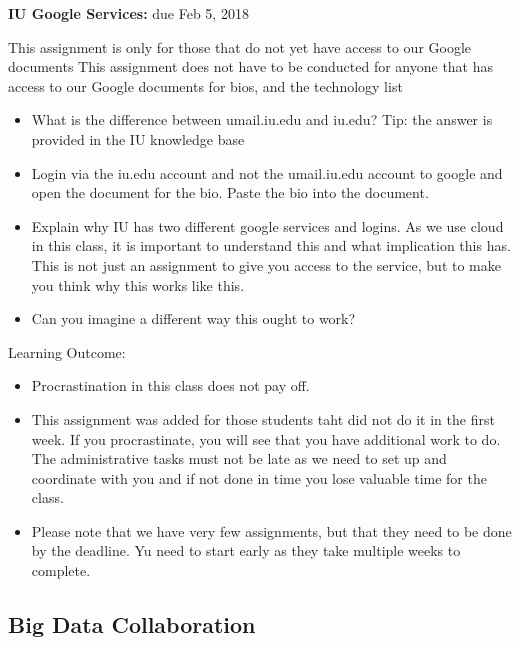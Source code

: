 \begin{exercise}\label{E:616-iu-google}

  {\bf IU Google Services:} due Feb 5, 2018
  
  This assignment is only for those that do
  not yet have access to our Google documents This assignment does not
  have to be conducted for anyone that has access to our Google
  documents for bios, and the technology list

  \begin{itemize}
 
  \item What is the difference between umail.iu.edu and iu.edu? Tip:
    the answer is provided in the IU knowledge base

  \item Login via the iu.edu account and not the umail.iu.edu account
    to google and open the document for the bio. Paste the bio into
    the document.

  \item Explain why IU has two different google services and
    logins. As we use cloud in this class, it is important to
    understand this and what implication this has. This is not just an
    assignment to give you access to the service, but to make you
    think why this works like this.

  \item Can you imagine a different way this ought to work?

  \end{itemize}

\end{exercise}

Learning Outcome:

\begin{itemize}
\item Procrastination in this class does not pay off. 
\item This assignment
  was added for those students taht did not do it in the first week. If you
  procrastinate, you will see that you have additional work to do. The
  administrative tasks must not be late as we need to set up and
  coordinate with you and if not done in time you lose valuable time
  for the class. 
\item Please note that we have very few assignments, but that they
  need to be done by the deadline. Yu need to start early as they take
  multiple weeks to complete.
\end{itemize}

\subsection{Big Data Collaboration}
\label{E:616-bigdata-collab}

